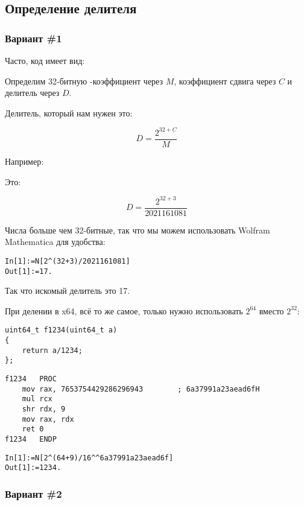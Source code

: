 ﻿\subsection{Определение делителя}

\subsubsection{Вариант \#1}

Часто, код имеет вид:



Определим 32-битную -коэффициент через $M$, коэффициент сдвига через $C$ и делитель через $D$.

Делитель, который нам нужен это:

\[
D=\frac{2^{32 + C}}{M}
\]

Например:



Это:

\[
D=\frac{2^{32 + 3}}{2021161081}
\]

Числа больше чем 32-битные, так что мы можем использовать Wolfram Mathematica для удобства:

\begin{lstlisting}[caption=Wolfram Mathematica]
In[1]:=N[2^(32+3)/2021161081]
Out[1]:=17.
\end{lstlisting}

Так что искомый делитель это 17.

При делении в x64, всё то же самое, только нужно использовать $2^{64}$ вместо $2^{32}$:

\begin{lstlisting}
uint64_t f1234(uint64_t a)
{
	return a/1234;
};
\end{lstlisting}

\begin{lstlisting}[caption=\Optimizing MSVC 2012 x64]
f1234	PROC
	mov	rax, 7653754429286296943		; 6a37991a23aead6fH
	mul	rcx
	shr	rdx, 9
	mov	rax, rdx
	ret	0
f1234	ENDP
\end{lstlisting}

\begin{lstlisting}[caption=Wolfram Mathematica]
In[1]:=N[2^(64+9)/16^^6a37991a23aead6f]
Out[1]:=1234.
\end{lstlisting}

\subsubsection{Вариант \#2}

